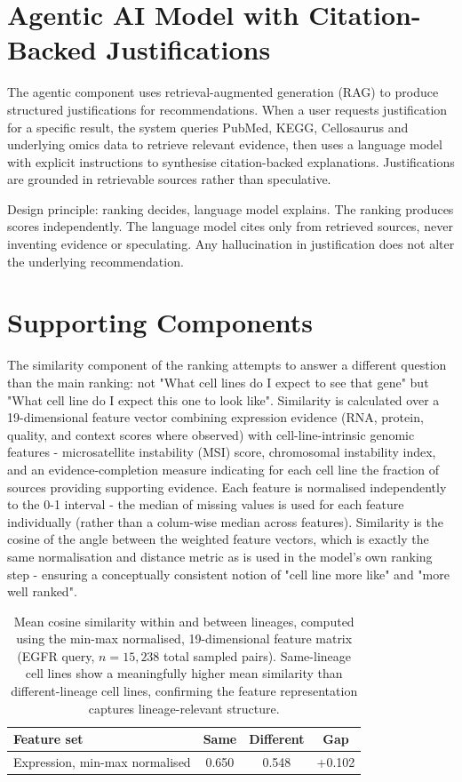 \documentclass[author={Karen Coutinho, Ishaan Bhalla, Aman Raj, Dixit Kaloorani Malarmannan},
                supervisor={Dr. Daniel D'Andrea},
                degree={MSc},
                title={CellSelector Omics: A Multi-Omics Recommendation System for Cell Line Selection},
                subtitle={},
                type={},
                year={2026}]{dissertation}
\begin{document}
\section{Agentic AI Model with Citation-Backed Justifications}

The agentic component uses retrieval-augmented generation (RAG) to produce structured justifications for recommendations. When a user requests justification for a specific result, the system queries PubMed, KEGG, Cellosaurus and underlying omics data to retrieve relevant evidence, then uses a language model with explicit instructions to synthesise citation-backed explanations. Justifications are grounded in retrievable sources rather than speculative.

Design principle: ranking decides, language model explains. The ranking produces scores independently. The language model cites only from retrieved sources, never inventing evidence or speculating. Any hallucination in justification does not alter the underlying recommendation.

\section{Supporting Components}

The similarity component of the ranking attempts to answer a different question than the main ranking: not "What cell lines do I expect to see that gene" but "What cell line do I expect this one to look like". Similarity is calculated over a 19-dimensional feature vector combining expression evidence (RNA, protein, quality, and context scores where observed) with cell-line-intrinsic genomic features - microsatellite instability (MSI) score, chromosomal instability index, and an evidence-completion measure indicating for each cell line the fraction of sources providing supporting evidence. Each feature is normalised independently to the 0-1 interval - the median of missing values is used for each feature individually (rather than a colum-wise median across features). Similarity is the cosine of the angle between the weighted feature vectors, which is exactly the same normalisation and distance metric as is used in the model's own ranking step - ensuring a conceptually consistent notion of "cell line more like" and "more well ranked".

\begin{table}[t]
\centering
\begin{tabular}{|l|c|c|c|}
\hline
{\bf Feature set} & {\bf Same} & {\bf Different} & {\bf Gap} \\
\hline
Expression, min-max normalised & 0.650 & 0.548 & +0.102 \\
\hline
\end{tabular}
\caption{Mean cosine similarity within and between lineages, computed using the min-max normalised, 19-dimensional feature matrix (EGFR query, $n = 15,238$ total sampled pairs). Same-lineage cell lines show a meaningfully higher mean similarity than different-lineage cell lines, confirming the feature representation captures lineage-relevant structure.}
\label{tab:similarity-scaling}
\end{table}
\end{document}
